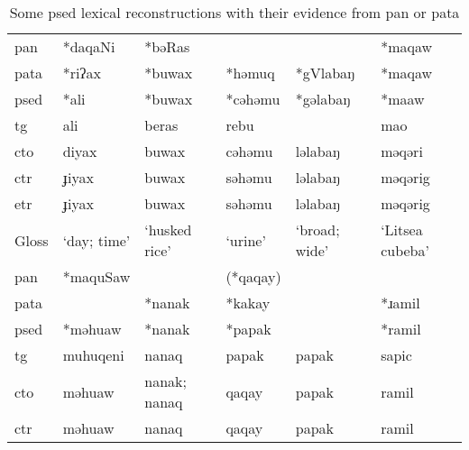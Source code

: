 \begingroup
{}
\renewcommand\arraystretch{1.5}
\begin{table}[!htbp]
\centering
\caption{Some \acl{psed} lexical reconstructions with their evidence from \ac{pan} or \ac{pata}}
\label{tab:lex_recon}
\begin{tabular}{l>{\raggedright\arraybackslash}p{2cm}>{\raggedright\arraybackslash}p{2cm}>{\raggedright\arraybackslash}p{2cm}>{\raggedright\arraybackslash}p{2cm}>{\raggedright\arraybackslash}p{2cm}}
\hline
\acs{pan}  & *daqaNi       & *bəRas              &                &                 & *maqaw                  \\
\acs{pata} & *riʔax        & *buwax              & *həmuq         & *gVlabaŋ        & *maqaw                  \\ 
\acs{psed} & *ali          & *buwax              & *cəhəmu        & *gəlabaŋ        & *maaw                   \\ \hdashline
\acs{tg}   & ali           & beras               & rebu           &                 & mao                     \\
\acs{cto}  & diyax         & buwax               & cəhəmu         & ləlabaŋ         & məqəri                  \\
\acs{ctr}  & ɟiyax         & buwax               & səhəmu         & ləlabaŋ         & məqərig                 \\
\acs{etr}  & ɟiyax         & buwax               & səhəmu         & ləlabaŋ         & məqərig                 \\
Gloss      & `day; time'   & `husked rice'       & `urine'        & `broad; wide'   & `Litsea cubeba' \\ \hline\hline
\acs{pan}  & *maquSaw      &                     & (*qaqay)       &                 &                         \\
\acs{pata} &               & *nanak              & *kakay         &                 & *ɹamil                  \\ 
\acs{psed} & *məhuaw       & *nanak              & *papak         &                 & *ramil                  \\ \hdashline
\acs{tg}   & muhuqeni      & nanaq               & papak          & papak           & sapic                   \\
\acs{cto}  & məhuaw        & nanak; nanaq        & qaqay          & papak           & ramil                   \\
\acs{ctr}  & məhuaw        & nanaq               & qaqay          & papak           & ramil                   \\

\end{tabular}
\end{table}
